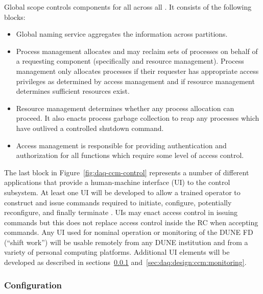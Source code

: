 Global scope controls  components for all  across all .  It consists of the following blocks:


\begin{itemize}
\item Global naming service aggregates the  information across partitions.  

\item Process management allocates and may reclaim sets of processes on behalf of a requesting component (specifically  and resource management). 
  Process management only allocates processes if their requester has appropriate access privileges as determined by access management and if resource management determines sufficient resources exist. 
  
\item Resource management determines whether any process allocation can proceed.  It also enacts process garbage collection to reap any processes which have outlived a controlled shutdown command.

  
\item Access management is responsible for providing authentication and authorization for all  functions which require some level of access control. 

\end{itemize}

The last block in Figure~\ref{fig:daq-ccm-control} represents a number of different applications that provide a human-machine interface (UI) to the control subsystem.
At least one UI will be developed to allow a trained operator to construct and issue commands required to initiate, configure, potentially reconfigure, and finally terminate . 
UIs may enact access control in issuing commands but this does not replace access control inside the RC when accepting commands.
Any UI used for nominal operation or monitoring of the DUNE FD  (``shift work'') will be usable remotely from any DUNE institution and from a variety of personal computing platforms.  
Additional UI elements will be developed as described in sections~\ref{sec:daq:design:ccm:configuration} and~\ref{sec:daq:design:ccm:monitoring}.


\subsubsection{Configuration}
\label{sec:daq:design:ccm:configuration}


